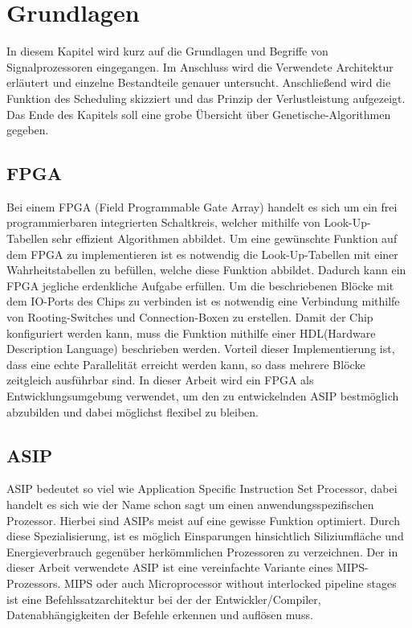 \chapter{Grundlagen}
\label{chap:grundlagen}
In diesem Kapitel wird kurz auf die Grundlagen und Begriffe von Signalprozessoren eingegangen. Im Anschluss wird die Verwendete Architektur erläutert und einzelne Bestandteile genauer untersucht. Anschließend wird die Funktion des Scheduling skizziert und das Prinzip der Verlustleistung aufgezeigt. Das Ende des Kapitels soll eine grobe Übersicht über Genetische-Algorithmen gegeben.

\section{FPGA}
Bei einem FPGA (Field Programmable Gate Array) handelt es sich um ein frei programmierbaren integrierten Schaltkreis, welcher mithilfe von Look-Up-Tabellen sehr effizient Algorithmen abbildet. Um eine gewünschte Funktion auf dem FPGA zu implementieren ist es notwendig die Look-Up-Tabellen mit einer Wahrheitstabellen zu befüllen, welche diese Funktion abbildet. Dadurch kann ein FPGA jegliche erdenkliche Aufgabe erfüllen. Um die beschriebenen Blöcke mit dem IO-Ports des Chips zu verbinden ist es notwendig eine Verbindung mithilfe von Rooting-Switches und Connection-Boxen zu erstellen. Damit der Chip konfiguriert werden kann, muss die Funktion mithilfe einer HDL(Hardware Description Language) beschrieben werden.\cite{farooq2012fpga} Vorteil dieser Implementierung ist, dass eine echte Parallelität erreicht werden kann, so dass mehrere Blöcke zeitgleich ausführbar sind. In dieser Arbeit wird ein FPGA als Entwicklungsumgebung verwendet, um den zu entwickelnden ASIP bestmöglich abzubilden und dabei möglichst flexibel zu bleiben.


\section{ASIP}
ASIP bedeutet so viel wie Application Specific Instruction Set Processor, dabei handelt es sich wie der Name schon sagt um einen anwendungsspezifischen Prozessor. Hierbei sind ASIPs meist auf eine gewisse Funktion optimiert. Durch diese Spezialisierung, ist es möglich Einsparungen hinsichtlich Siliziumfläche und Energieverbrauch gegenüber herkömmlichen Prozessoren zu verzeichnen. Der in dieser Arbeit verwendete ASIP ist eine vereinfachte Variante eines MIPS-Prozessors. MIPS oder auch \glqq Microprocessor without interlocked pipeline stages\grqq{} ist eine Befehlssatzarchitektur bei der der Entwickler/Compiler, Datenabhängigkeiten der Befehle erkennen und auflösen muss.

